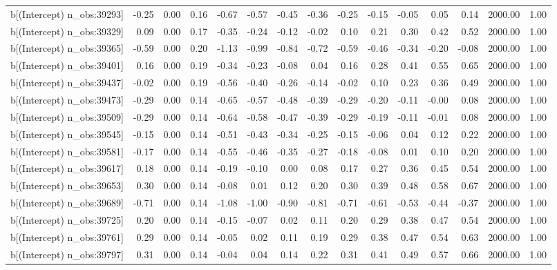 \begin{table}[ht]
\begin{tabular}{rrrrrrrrrrrrrrr}
  b[(Intercept) n\_obs:39293] & -0.25 & 0.00 & 0.16 & -0.67 & -0.57 & -0.45 & -0.36 & -0.25 & -0.15 & -0.05 & 0.05 & 0.14 & 2000.00 & 1.00 \\ 
  b[(Intercept) n\_obs:39329] & 0.09 & 0.00 & 0.17 & -0.35 & -0.24 & -0.12 & -0.02 & 0.10 & 0.21 & 0.30 & 0.42 & 0.52 & 2000.00 & 1.00 \\ 
  b[(Intercept) n\_obs:39365] & -0.59 & 0.00 & 0.20 & -1.13 & -0.99 & -0.84 & -0.72 & -0.59 & -0.46 & -0.34 & -0.20 & -0.08 & 2000.00 & 1.00 \\ 
  b[(Intercept) n\_obs:39401] & 0.16 & 0.00 & 0.19 & -0.34 & -0.23 & -0.08 & 0.04 & 0.16 & 0.28 & 0.41 & 0.55 & 0.65 & 2000.00 & 1.00 \\ 
  b[(Intercept) n\_obs:39437] & -0.02 & 0.00 & 0.19 & -0.56 & -0.40 & -0.26 & -0.14 & -0.02 & 0.10 & 0.23 & 0.36 & 0.49 & 2000.00 & 1.00 \\ 
  b[(Intercept) n\_obs:39473] & -0.29 & 0.00 & 0.14 & -0.65 & -0.57 & -0.48 & -0.39 & -0.29 & -0.20 & -0.11 & -0.00 & 0.08 & 2000.00 & 1.00 \\ 
  b[(Intercept) n\_obs:39509] & -0.29 & 0.00 & 0.14 & -0.64 & -0.58 & -0.47 & -0.39 & -0.29 & -0.19 & -0.11 & -0.01 & 0.08 & 2000.00 & 1.00 \\ 
  b[(Intercept) n\_obs:39545] & -0.15 & 0.00 & 0.14 & -0.51 & -0.43 & -0.34 & -0.25 & -0.15 & -0.06 & 0.04 & 0.12 & 0.22 & 2000.00 & 1.00 \\ 
  b[(Intercept) n\_obs:39581] & -0.17 & 0.00 & 0.14 & -0.55 & -0.46 & -0.35 & -0.27 & -0.18 & -0.08 & 0.01 & 0.10 & 0.20 & 2000.00 & 1.00 \\ 
  b[(Intercept) n\_obs:39617] & 0.18 & 0.00 & 0.14 & -0.19 & -0.10 & 0.00 & 0.08 & 0.17 & 0.27 & 0.36 & 0.45 & 0.54 & 2000.00 & 1.00 \\ 
  b[(Intercept) n\_obs:39653] & 0.30 & 0.00 & 0.14 & -0.08 & 0.01 & 0.12 & 0.20 & 0.30 & 0.39 & 0.48 & 0.58 & 0.67 & 2000.00 & 1.00 \\ 
  b[(Intercept) n\_obs:39689] & -0.71 & 0.00 & 0.14 & -1.08 & -1.00 & -0.90 & -0.81 & -0.71 & -0.61 & -0.53 & -0.44 & -0.37 & 2000.00 & 1.00 \\ 
  b[(Intercept) n\_obs:39725] & 0.20 & 0.00 & 0.14 & -0.15 & -0.07 & 0.02 & 0.11 & 0.20 & 0.29 & 0.38 & 0.47 & 0.54 & 2000.00 & 1.00 \\ 
  b[(Intercept) n\_obs:39761] & 0.29 & 0.00 & 0.14 & -0.05 & 0.02 & 0.11 & 0.19 & 0.29 & 0.38 & 0.47 & 0.54 & 0.63 & 2000.00 & 1.00 \\ 
  b[(Intercept) n\_obs:39797] & 0.31 & 0.00 & 0.14 & -0.04 & 0.04 & 0.14 & 0.22 & 0.31 & 0.41 & 0.49 & 0.57 & 0.66 & 2000.00 & 1.00 \\ 

\end{tabular}
\end{table}
